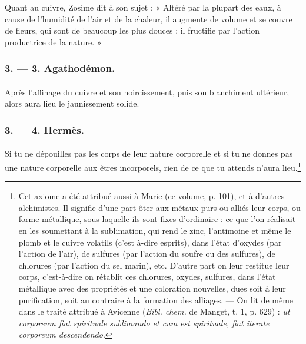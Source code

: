 \documentclass[landscape, a4paper, 11pt, oneside, polutonikogreek, french]{article}
\begin{document}
Quant au cuivre, Zosime dit à son sujet : « Altéré par la plupart des eaux, à cause de l'humidité de l'air et de la chaleur, il augmente de volume et se couvre de fleurs, qui sont de beaucoup les plus douces ; il fructifie par l'action productrice de la nature. »

\bigskip
\centerline{\EightStarTaper}
\centerline{\EightStarTaper\EightStarTaper}
\bigskip

\subsubsection{3. --- 3. Agathodémon.}
\paragraph{}
Après l'affinage du cuivre et son noircissement, puis son blanchiment ultérieur, alors aura lieu le jaunissement solide.

\bigskip
\centerline{\EightStarTaper}
\centerline{\EightStarTaper\EightStarTaper}
\bigskip

\subsubsection{3. --- 4. Hermès.}
\paragraph{}
Si tu ne dépouilles pas les corps de leur nature corporelle et si tu ne donnes pas une nature corporelle aux êtres incorporels, rien de ce que tu attends n'aura lieu.\footnote{Cet axiome a été attribué aussi à Marie (ce volume, p. 101), et à d'autres alchimistes. Il signifie d'une part ôter aux métaux purs ou alliés leur corps, ou forme métallique, sous laquelle ils sont fixes d'ordinaire : ce que l'on réalisait en les soumettant à la sublimation, qui rend le zinc, l'antimoine et même le plomb et le cuivre volatils (c'est à-dire esprits), dans l'état d'oxydes (par l'action de l'air), de sulfures (par l'action du soufre ou des sulfures), de chlorures (par l'action du sel marin), etc. D'autre part on leur restitue leur corps, c'est-à-dire on rétablit ces chlorures, oxydes, sulfures, dans l'état métallique avec des propriétés et une coloration nouvelles, dues soit à leur purification, soit au contraire à la formation des alliages. --- On lit de même dans le traité attribué à Avicenne (\emph{Bibl. chem.} de Manget, t. 1, p. 629) : \emph{ut corporeum fiat spirituale sublimando et cum est spirituale, fiat iterate corporeum descendendo}.}
\clearpage
\bigskip
\centerline{\EightStarTaper}
\centerline{\EightStarTaper\EightStarTaper}
\bigskip
\end{document}
